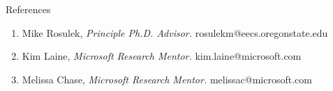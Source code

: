\documentclass{resume} %
\begin{document}

\begin{rSection}{References}
	
	\begin{enumerate}[label=R\arabic* --]
		
		\item Mike Rosulek, \emph{Principle Ph.D. Advisor.} rosulekm@eecs.oregonstate.edu
		
		\item Kim Laine,  \emph{Microsoft Research Mentor.} kim.laine@microsoft.com
		
		\item Melissa Chase, \emph{Microsoft Research Mentor.} melissac@microsoft.com
		
		
	\end{enumerate}
	
\end{rSection}






\end{document}
